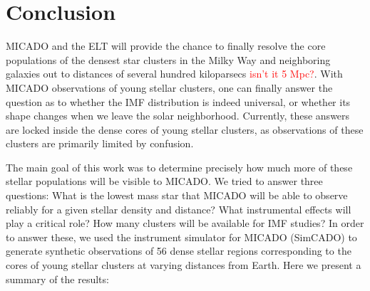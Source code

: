 \section{Conclusion}
\label{sec:conclusion}

MICADO and the ELT will provide the chance to finally resolve the core populations of the densest star clusters in the Milky Way and neighboring galaxies out to distances of several hundred kiloparsecs \textcolor{red}{isn't it 5 Mpc?}.  With MICADO observations of young stellar clusters, one can finally answer the question as to whether the IMF distribution is indeed universal, or whether its shape changes when we leave the solar neighborhood. Currently, these answers are locked inside the dense cores of young stellar clusters, as observations of these clusters are primarily limited by confusion.

The main goal of this work was to determine precisely how much more of these stellar populations will be visible to MICADO. We tried to answer three questions: What is the lowest mass star that MICADO will be able to observe reliably for a given stellar density and distance? What instrumental effects will play a critical role? How many clusters will be available for IMF studies? In order to answer these, we used the instrument simulator for MICADO (SimCADO) to generate synthetic observations of 56 dense stellar regions corresponding to the cores of young stellar clusters at varying distances from Earth. Here we present a summary of the results:

